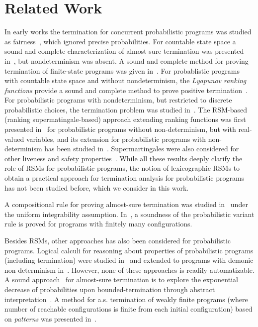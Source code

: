 
\section{Related Work}

\smallskip{}
In early works the termination for concurrent probabilistic programs was studied 
as fairness~\cite{SPH84}, which ignored precise probabilities.
For countable state space a sound and complete characterization of almost-sure termination 
was presented in~\cite{HS85}, but nondeterminism was absent.
A sound and complete method for proving termination of finite-state programs
was given in~\cite{EGK12}.
For probablistic programs with countable state space and without 
nondeterminism, the {\em Lyapunov ranking functions} provide a sound and 
complete method to prove positive termination~\cite{BG05,Foster53}.
For probabilistic programs with nondeterminism, but restricted to discrete probabilistic
choices, the termination problem was studied 
in~\cite{MM04,MM05}.
The RSM-based (ranking supermatingale-based) approach extending ranking functions was first 
presented in~\cite{SriramCAV} for probabilistic programs without non-determinism,
but with real-valued variables, and its extension for probabilistic programs
with non-determinism has been studied 
in~\cite{HolgerPOPL,CF17,CFNH16:prob-termination,CFG16,CNZ17,MM16:proofrule-arxiv}. 
Supermartingales were also 
considered for other liveness and safety 
properties~\cite{CVS16:martingale-recurrence-persistence,BEFH16:doob}.
While all these results deeply clarify the role of RSMs for probabilistic programs, 
the notion of lexicographic RSMs to obtain a practical approach for termination 
analysis for probabilistic programs has not been studied before, which we consider in 
this work.

\smallskip{} 
A 
compositional rule for proving almost-sure termination was studied 
in~\cite{HolgerPOPL} under the uniform integrability assumption. 
In~\cite{MM05}, a soundness of the probabilistic variant rule is proved for 
programs with finitely many configurations.


\smallskip{}
Besides RSMs, other approaches has also been considered for probabilistic programs.
Logical calculi for reasoning about properties of 
probabilistic programs (including termination) were studied 
in~\cite{Kozen:prob-semantics,FH:prdl,Kozen:probabilistic-PDL,Feldman:propositional-probdl}
 and extended to programs with demonic non-determinism 
 in~\cite{MM04,MM05,KKMO16:wp-expected-runtime,OKKM16:recursive-prob-wp-calculus,GKI14:prob-semantics,
  DBLP:conf/sas/KatoenMMM10}. However, none of these approaches is readily 
  automatizable.
A sound approach~\cite{DBLP:conf/sas/Monniaux01} for almost-sure termination 
is to explore the exponential decrease of probabilities upon 
bounded-termination 
through abstract interpretation~\cite{DBLP:conf/popl/CousotC77}. A method for 
a.s. termination of weakly finite programs (where number of reachable 
configurations is finite from each initial configuration) based on 
\emph{patterns} was presented in~\cite{EGK12}.
 

